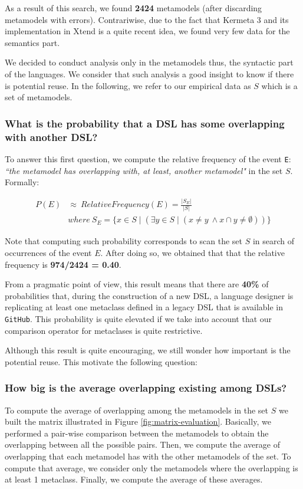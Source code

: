 As a result of this search, we found \textbf{2424} metamodels (after discarding metamodels with errors). Contrariwise, due to the fact that Kermeta 3 and its implementation in Xtend is a quite recent idea, we found very few data for the semantics part. 

We decided to conduct analysis only in the metamodels thus, the syntactic part of the languages. We consider that such analysis a good insight to know if there is potential reuse.  In the following, we refer to our empirical data as $S$ which is a set of metamodels.

\vspace{-3mm}
\subsubsection{What is the probability that a DSL has some overlapping with another DSL?} To answer this first question, we compute the relative frequency of the event \texttt{E}: \textit{``the metamodel has overlapping with, at least, another metamodel"} in the set $S$. Formally:

\begin{equation}
\begin{split}
P(E) & \approx ~ Relative Frequency (E) = \frac{|S_{E}|}{|S|}\\
& where ~ S_{E} = \{x \in S \mid (\exists y \in S \mid (x \neq y ~ \wedge x \cap y \neq \emptyset )) \}
\end{split}
\end{equation}

Note that computing such probability corresponds to scan the set $S$ in search of occurrences of the event $E$. After doing so, we obtained that that the relative frequency is \textbf{974/2424 = 0.40}.

From a pragmatic point of view, this result means that there are \textbf{40\%} of probabilities that, during the construction of a new DSL, a language designer is replicating at least one metaclass defined in a legacy DSL that is available in \texttt{GitHub}. This probability is quite elevated if we take into account that our comparison operator for metaclases is quite restrictive.

Although this result is quite encouraging, we still wonder how important is the potential reuse. This motivate the following question:

\vspace{-3mm}
\subsubsection{How big is the average overlapping existing among DSLs?} To compute the average of overlapping among the metamodels in the set $S$ we built the matrix illustrated in Figure \ref{fig:matrix-evaluation}. Basically, we performed a pair-wise comparison between the metamodels to obtain the overlapping between all the possible pairs. Then, we compute the average of overlapping that each metamodel has with the other metamodels of the set. To compute that average, we consider only the metamodels where the overlapping is at least 1 metaclass. Finally, we compute the average of these averages.

